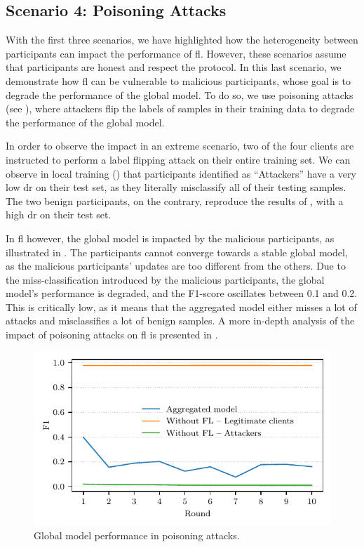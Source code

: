 \subsection{Scenario 4: Poisoning Attacks\label{sec:demo.poisoning}}

With the first three scenarios, we have highlighted how the heterogeneity between participants can impact the performance of \gls{fl}.
However, these scenarios assume that participants are honest and respect the protocol.
In this last scenario, we demonstrate how \gls{fl} can be vulnerable to malicious participants, whose goal is to degrade the performance of the global model.
To do so, we use poisoning attacks (see ), where attackers flip the labels of  samples in their training data to degrade the performance of the global model.

In order to observe the impact in an extreme scenario, two of the four clients are instructed to perform a label flipping attack on their entire training set.
We can observe in local training () that participants identified as ``Attackers'' have a very low \gls{dr} on their test set, as they literally misclassify all of their testing samples.
The two benign participants, on the contrary, reproduce the results of , with a high \gls{dr} on their test set.

In \gls{fl} however, the global model is impacted by the malicious participants, as illustrated in .
The participants cannot converge towards a stable global model, as the malicious participants' updates are too different from the others.
Due to the miss-classification introduced by the malicious participants, the global model's performance is degraded, and the F1-score oscillates between 0.1 and 0.2.
This is critically low, as it means that the aggregated model either misses a lot of attacks and misclassifies a lot of benign samples.
A more in-depth analysis of the impact of poisoning attacks on \gls{fl} is presented in .

\begin{figure}
    \centering
    \includegraphics{figures/poisoning.pdf}
    \caption{Global model performance in poisoning attacks.}
    \label{fig:poisoning}
\end{figure}
